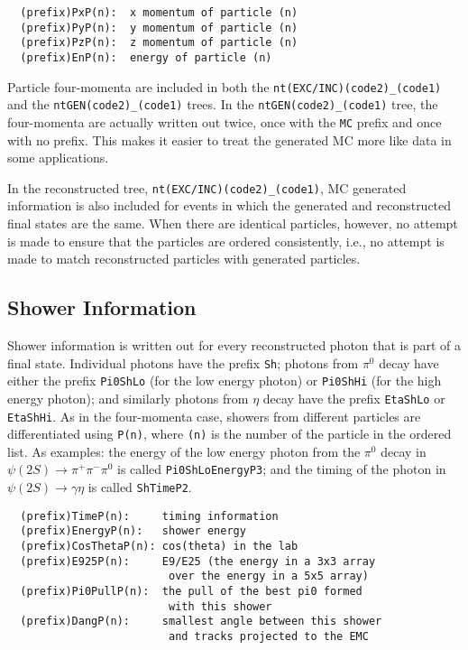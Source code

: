 \documentclass[11pt]{article}
\begin{document}
\begin{verbatim}
  (prefix)PxP(n):  x momentum of particle (n)
  (prefix)PyP(n):  y momentum of particle (n)
  (prefix)PzP(n):  z momentum of particle (n)
  (prefix)EnP(n):  energy of particle (n)
\end{verbatim}

Particle four-momenta are included in both the {\tt nt(EXC/INC)(code2)\_(code1)} and the {\tt ntGEN(code2)\_(code1)} trees.  In the {\tt ntGEN(code2)\_(code1)} tree, the four-momenta are actually written out twice, once with the {\tt MC} prefix and once with no prefix.  This makes it easier to treat the generated MC more like data in some applications.

In the reconstructed tree, {\tt nt(EXC/INC)(code2)\_(code1)}, MC generated information is also included for events in which the generated and reconstructed final states are the same.  When there are identical particles, however, no attempt is made to ensure that the particles are ordered consistently, i.e., no attempt is made to match reconstructed particles with generated particles.


\subsection{Shower Information}

Shower information is written out for every reconstructed photon that is part of a final state.  Individual photons have the prefix {\tt Sh}; photons from $\pi^0$ decay have either the prefix {\tt Pi0ShLo} (for the low energy photon) or {\tt Pi0ShHi} (for the high energy photon); and similarly photons from $\eta$ decay have the prefix {\tt EtaShLo} or {\tt EtaShHi}.  As in the four-momenta case, showers from different particles are differentiated using {\tt P(n)}, where {\tt (n)} is the number of the particle in the ordered list.  As examples: the energy of the low energy photon from the $\pi^0$ decay in $\psi(2S)\to\pi^+\pi^-\pi^0$ is called {\tt Pi0ShLoEnergyP3}; and the timing of the photon in $\psi(2S)\to\gamma\eta$ is called {\tt ShTimeP2}.
\begin{verbatim}
  (prefix)TimeP(n):     timing information
  (prefix)EnergyP(n):   shower energy
  (prefix)CosThetaP(n): cos(theta) in the lab
  (prefix)E925P(n):     E9/E25 (the energy in a 3x3 array
                         over the energy in a 5x5 array)
  (prefix)Pi0PullP(n):  the pull of the best pi0 formed
                         with this shower
  (prefix)DangP(n):     smallest angle between this shower
                         and tracks projected to the EMC
\end{verbatim}
\end{document}
